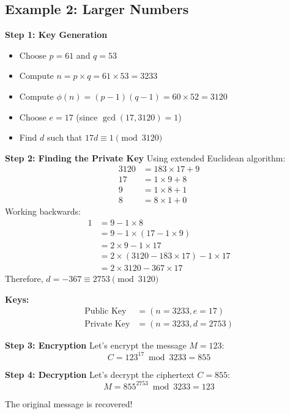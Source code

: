\documentclass[11pt,a4paper]{article}
\begin{document}
\subsection{Example 2: Larger Numbers}

\begin{examplebox}
\textbf{Step 1: Key Generation}
\begin{itemize}
    \item Choose $p = 61$ and $q = 53$
    \item Compute $n = p \times q = 61 \times 53 = 3233$
    \item Compute $\phi(n) = (p-1)(q-1) = 60 \times 52 = 3120$
    \item Choose $e = 17$ (since $\gcd(17, 3120) = 1$)
    \item Find $d$ such that $17d \equiv 1 \pmod{3120}$
\end{itemize}

\textbf{Step 2: Finding the Private Key}
Using extended Euclidean algorithm:
\begin{align*}
3120 &= 183 \times 17 + 9 \\
17 &= 1 \times 9 + 8 \\
9 &= 1 \times 8 + 1 \\
8 &= 8 \times 1 + 0
\end{align*}
Working backwards:
\begin{align*}
1 &= 9 - 1 \times 8 \\
&= 9 - 1 \times (17 - 1 \times 9) \\
&= 2 \times 9 - 1 \times 17 \\
&= 2 \times (3120 - 183 \times 17) - 1 \times 17 \\
&= 2 \times 3120 - 367 \times 17
\end{align*}
Therefore, $d = -367 \equiv 2753 \pmod{3120}$

\textbf{Keys:}
\begin{align*}
\text{Public Key} &= (n=3233, e=17) \\
\text{Private Key} &= (n=3233, d=2753)
\end{align*}

\textbf{Step 3: Encryption}
Let's encrypt the message $M = 123$:
$$C = 123^{17} \bmod 3233 = 855$$

\textbf{Step 4: Decryption}
Let's decrypt the ciphertext $C = 855$:
$$M = 855^{2753} \bmod 3233 = 123$$

The original message is recovered!
\end{examplebox}
\end{document}
